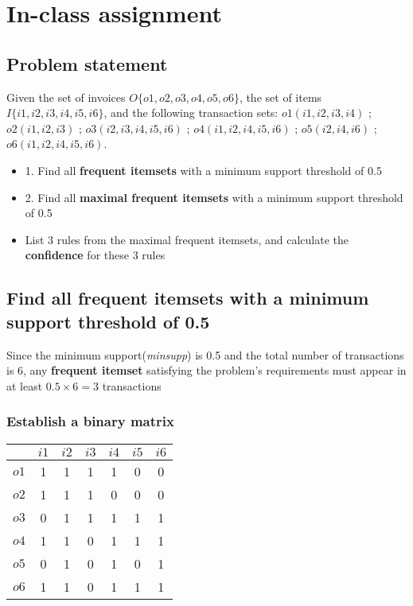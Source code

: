 \section{In-class assignment}
\subsection{Problem statement}
Given the set of invoices \(O\{o1,o2,o3,o4,o5,o6\}\), the set of items \(I\{i1,i2,i3,i4,i5,i6\}\), and the following transaction sets: \(o1(i1,i2,i3,i4)\) ; \(o2(i1,i2,i3)\) ; \(o3(i2,i3,i4,i5,i6)\) ; \(o4(i1,i2,i4,i5,i6)\) ; \(o5(i2,i4,i6)\) ; \(o6(i1,i2,i4,i5,i6)\).
\begin{itemize}
\item 1. Find all \textbf{frequent itemsets} with a minimum support threshold of 0.5
\item 2. Find all \textbf{maximal frequent itemsets} with a minimum support threshold of 0.5
\item List 3 rules from the maximal frequent itemsets, and calculate the \textbf{confidence} for these 3 rules
\end{itemize}
\subsection{Find all \textbf{frequent itemsets} with a minimum support threshold of 0.5}
Since the minimum support(\textit{minsupp}) is 0.5 and the total number of transactions is 6, any \textbf{frequent itemset} satisfying the problem's requirements must appear in at least \(0.5 \times 6 = 3\) transactions
\subsubsection{Establish a binary matrix}
\begin{center}
\begin{tabular}{|*{7}{c|}}
\hline & \(i1\) & \(i2\) & \(i3\) & \(i4\) & \(i5\) & \(i6\) \\
\hline \(o1\) & 1 & 1 & 1 & 1 & 0 & 0 \\
\hline \(o2\) & 1 & 1 & 1 & 0 & 0 & 0 \\
\hline \(o3\) & 0 & 1 & 1 & 1 & 1 & 1 \\
\hline \(o4\) & 1 & 1 & 0 & 1 & 1 & 1 \\
\hline \(o5\) & 0 & 1 & 0 & 1 & 0 & 1 \\
\hline \(o6\) & 1 & 1 & 0 & 1 & 1 & 1 \\
\hline
\end{tabular}
\end{center}
